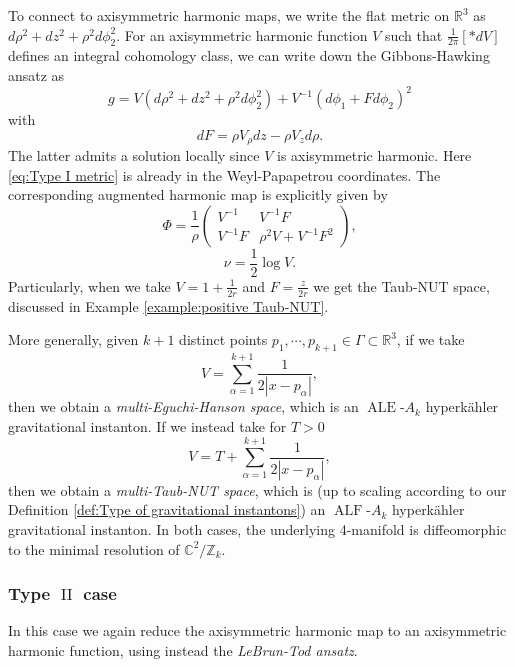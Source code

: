 \documentclass[a4paper,11pt]{amsart}
\theoremstyle{definition}
\numberwithin{equation}{section}
\newcommand{\C}{\mathbb{C}}
\newcommand{\R}{\mathbb{R}}
\DeclareMathOperator{\II}{II}
\DeclareMathOperator{\ALF}{ALF}
\DeclareMathOperator{\ALE}{ALE}
\begin{document}
To connect to  axisymmetric harmonic maps, we write the flat metric on $\R^3$ as $d\rho^2+dz^2+\rho^2d\phi_2^2$. For an axisymmetric harmonic function $V$ such that $\frac{1}{2\pi}[*dV]$ defines an integral cohomology class,  we can write  down the Gibbons-Hawking ansatz as 
\begin{equation}\label{eq:Type I metric}
    g=V(d\rho^2+dz^2+\rho^2d\phi_2^2)+V^{-1}(d\phi_1+Fd\phi_2)^2
\end{equation}
with $$dF=\rho V_\rho dz-\rho V_zd\rho.$$ The latter admits a solution locally since $V$ is axisymmetric harmonic. Here \eqref{eq:Type I metric} is already in the Weyl-Papapetrou coordinates. The corresponding augmented harmonic map is  explicitly given by
\begin{equation}\label{eqn:GH harmonic map}
    \Phi=\frac{1}{\rho}\left(\begin{matrix}
        V^{-1} & V^{-1}F \\ V^{-1}F & \rho^2 V+V^{-1}F^2
    \end{matrix}\right),
\end{equation}
\begin{equation}\label{eqn:GH augmentation}
\nu=\frac{1}{2}\log V.
\end{equation}
Particularly, when we take $V=1+\frac{1}{2r}$ and $F=\frac{z}{2r}$ we get the Taub-NUT space, discussed in Example \ref{example:positive Taub-NUT}.

More generally,  given $k+1$ distinct points $p_1, \cdots, p_{k+1}\in \Gamma\subset \mathbb R^3$, if we take 
$$V=\sum_{\alpha=1}^{k+1} \frac{1}{2|x-p_\alpha|},$$
then we obtain a  \emph{multi-Eguchi-Hanson space}, which is an $\ALE$-$A_k$ hyperk\"ahler gravitational instanton. If we instead take for $T>0$
$$V=T+\sum_{\alpha=1}^{k+1} \frac{1}{2|x-p_\alpha|},$$
then we obtain a \emph{multi-Taub-NUT space}, which is (up to scaling according to our Definition \ref{def:Type of gravitational instantons}) an $\ALF$-$A_k$ hyperk\"ahler gravitational instanton. In both cases, the underlying 4-manifold is diffeomorphic to the minimal resolution of $\C^2/\mathbb Z_k$.

\subsubsection{Type $\II$ case}
\label{subsubsec:Type II case}
In this case we again reduce the axisymmetric harmonic map  to an axisymmetric harmonic function, using instead the \emph{LeBrun-Tod ansatz}. 
\end{document}
